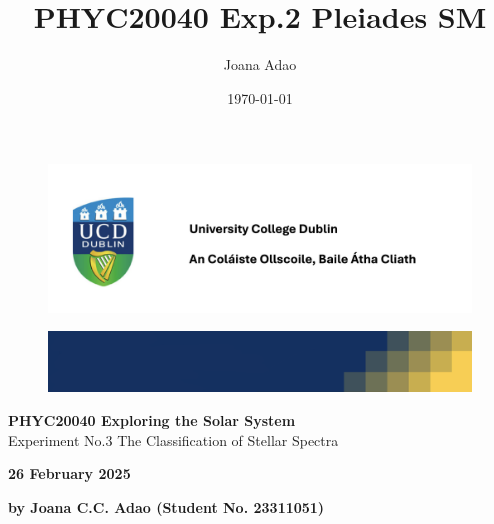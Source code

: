 \documentclass[12pt]{article}
\title{PHYC20040 Exp.2 Pleiades SM}
\author{Joana Adao}
\date{\today}
\begin{document}
\begin{titlepage}
    \begin{center}

        \begin{figure}[ht]
            \includegraphics[width=\textwidth]{UCDLogo.png}
        \end{figure}
        
        \begin{figure}
            \centerline{\includegraphics[width=\paperwidth]{UCDBanner.png}}
        \end{figure}

        \vspace{4cm}

        {\LARGE \bfseries PHYC20040 Exploring the Solar System}\\
        \vspace{0.75cm}
        {\Large Experiment No.3 The Classification of Stellar Spectra}
        
        \vspace{1cm}
    
    {\Large \textbf{26 February 2025}}

    \vspace{2cm}
    
    {\large \textbf{by Joana C.C. Adao (Student No. 23311051)}}\\

    \end{center}
    
   \clearpage

\end{titlepage}

\setcounter{page}{1}
\tableofcontents

\newpage
\end{document}
